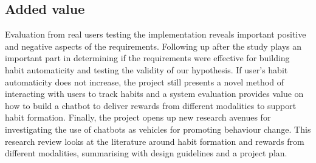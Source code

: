 \subsection*{Added value}
Evaluation from real users testing the implementation reveals important positive and negative aspects of the requirements. Following up after the study plays an important part in determining if the requirements were effective for building habit automaticity and testing the validity of our hypothesis. If user's habit automaticity does not increase, the project still presents a novel method of interacting with users to track habits and a system evaluation provides value on how to build a chatbot to deliver rewards from different modalities to support habit formation. Finally, the project opens up new research avenues for investigating the use of chatbots as vehicles for promoting behaviour change.\newline
\newline
This research review looks at the literature around habit formation and rewards from different modalities, summarising with design guidelines and a project plan.

\newpage

